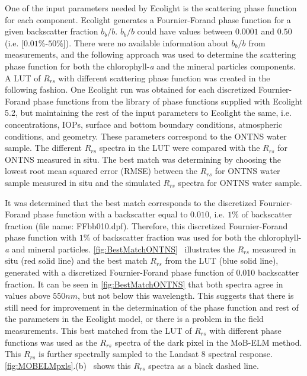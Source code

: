 \documentclass[onecolumn,3p]{elsarticle}
\begin{document}
One of the input parameters needed by Ecolight is the scattering phase function for each component. Ecolight generates a Fournier-Forand phase function for a given backscatter fraction $b_b/b$. $b_b/b$ could have values between $0.0001$ and $0.50$ (i.e. [$0.01\%$-$50\%$]). There were no available information about $b_b/b$ from measurements, and the following approach was used to determine the scattering phase function for both the chlorophyll-{\it a} and the mineral particles components. A LUT of $R_{rs}$ with different scattering phase function was created in the following fashion. One Ecolight run was obtained for each discretized Fournier-Forand phase functions from the library of phase functions supplied with Ecolight 5.2, but maintaining the rest of the input parameters to Ecolight the same, i.e. concentrations, IOPs, surface and bottom boundary conditions, atmospheric conditions, and geometry. These parameters correspond to the ONTNS water sample. The different $R_{rs}$ spectra in the LUT were compared with the $R_{rs}$ for ONTNS measured in situ. The best match was determining by choosing the lowest root mean squared error (RMSE) between the $R_{rs}$ for ONTNS water sample measured in situ and the simulated $R_{rs}$ spectra for ONTNS water sample.

It was determined that the best match corresponds to the discretized Fournier-Forand phase function with a backscatter equal to $0.010$, i.e. $1\%$ of backscatter fraction (file name: FFbb010.dpf). Therefore, this discretized Fournier-Forand phase function with $1\%$ of backscatter fraction was used for both the chlorophyll-{\it a} and mineral particles. \autoref{fig:BestMatchONTNS}~ illustrates the $R_{rs}$ measured in situ (red solid line) and the best match $R_{rs}$ from the LUT (blue solid line), generated with a discretized Fournier-Forand phase function of 0.010 backscatter fraction. {It can be seen in \autoref{fig:BestMatchONTNS} that both spectra agree in values above $550nm$, but not below this wavelength. This suggests that there is still need for improvement in the determination of the phase function and rest of the parameters in the Ecolight model, or there is a problem in the field measurements}. This best matched from the LUT of $R_{rs}$ with different phase functions was used as the $R_{rs}$ spectra of the dark pixel in the MoB-ELM method. This $R_{rs}$ is further spectrally sampled to the Landsat 8 spectral response. \autoref{fig:MOBELMpxls}.(b)~ shows this $R_{rs}$ spectra as a black dashed line.
\end{document}
